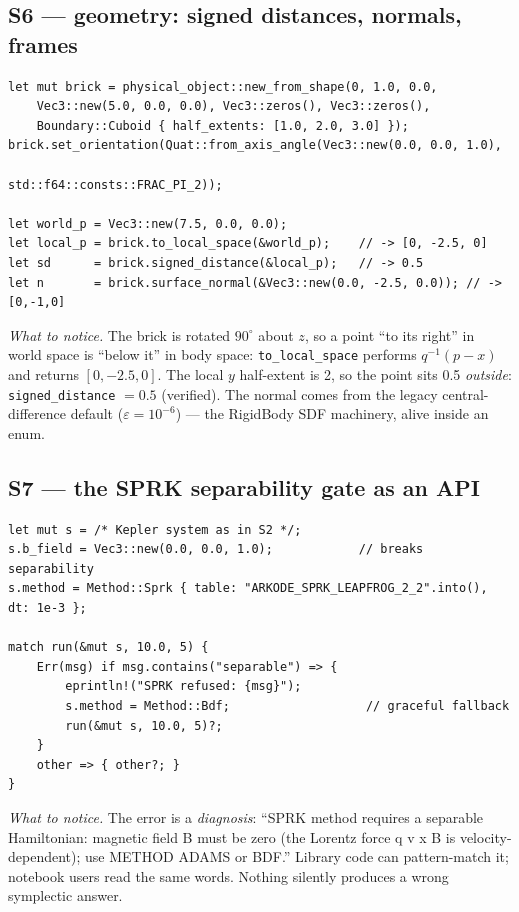 \documentclass[11pt]{article}
\newcommand{\code}[1]{\texttt{#1}}
\begin{document}
\subsection{S6 --- geometry: signed distances, normals, frames}

\begin{lstlisting}[language=RustLite]
let mut brick = physical_object::new_from_shape(0, 1.0, 0.0,
    Vec3::new(5.0, 0.0, 0.0), Vec3::zeros(), Vec3::zeros(),
    Boundary::Cuboid { half_extents: [1.0, 2.0, 3.0] });
brick.set_orientation(Quat::from_axis_angle(Vec3::new(0.0, 0.0, 1.0),
                                            std::f64::consts::FRAC_PI_2));

let world_p = Vec3::new(7.5, 0.0, 0.0);
let local_p = brick.to_local_space(&world_p);    // -> [0, -2.5, 0]
let sd      = brick.signed_distance(&local_p);   // -> 0.5
let n       = brick.surface_normal(&Vec3::new(0.0, -2.5, 0.0)); // -> [0,-1,0]
\end{lstlisting}

\emph{What to notice.} The brick is rotated $90^\circ$ about $z$, so a
point ``to its right'' in world space is ``below it'' in body space:
\code{to\_local\_space} performs $q^{-1}(p - x)$ and returns
$[0,-2.5,0]$. The local $y$ half-extent is 2, so the point sits 0.5
\emph{outside}: \code{signed\_distance} $= 0.5$ (verified). The normal
comes from the legacy central-difference default ($\varepsilon=10^{-6}$)
--- the RigidBody SDF machinery, alive inside an enum.

\subsection{S7 --- the SPRK separability gate as an API}

\begin{lstlisting}[language=RustLite]
let mut s = /* Kepler system as in S2 */;
s.b_field = Vec3::new(0.0, 0.0, 1.0);            // breaks separability
s.method = Method::Sprk { table: "ARKODE_SPRK_LEAPFROG_2_2".into(), dt: 1e-3 };

match run(&mut s, 10.0, 5) {
    Err(msg) if msg.contains("separable") => {
        eprintln!("SPRK refused: {msg}");
        s.method = Method::Bdf;                   // graceful fallback
        run(&mut s, 10.0, 5)?;
    }
    other => { other?; }
}
\end{lstlisting}

\emph{What to notice.} The error is a \emph{diagnosis}: ``SPRK method
requires a separable Hamiltonian: magnetic field B must be zero (the
Lorentz force q v x B is velocity-dependent); use METHOD ADAMS or
BDF.'' Library code can pattern-match it; notebook users read the same
words. Nothing silently produces a wrong symplectic answer.
\end{document}
